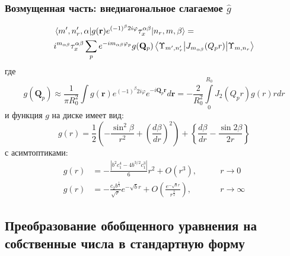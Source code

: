 \documentclass[a4paper,article,14pt]{extarticle}
\begin{document}
\subsubsection{Возмущенная часть: внедиагональное слагаемое $\hat g$}

\begin{equation}
\label{eq:final_g}
\begin{aligned}
&\mel{m', n'_r, \alpha} {g(\mathbf{r})   e^{ (-1)^{\beta} 2  i   \varphi} \tau^{\alpha \beta}_x} {n_r,m,\beta} = \\ 
&i^{m_{\alpha \beta}} \tau^{\alpha \beta}_x \sum\limits_{p}      e^{-i m_{\alpha \beta} \varphi_p}  g(\mathbf{Q}_p)\mel{\Upsilon_{m', n'_r}} {J_{m_{\alpha \beta}} ( Q_p r) }{\Upsilon_{m, n_r}}
\end{aligned}
\end{equation}
\noindent где 
\begin{equation}
\label{eq:fourier_g}
g (\mathbf{Q}_p) \approx \frac{1}{\pi R_0^2}  \int  g(\mathbf{r})   e^{ (-1)^{\beta} 2  i   \varphi} e^{-i \mathbf{Q}_p \mathbf{r}}  d\mathbf{r} = - \frac{2}{R_0^2}  \int\limits_{0}^{R_0}  J_2 (Q_p r ) g(r) r dr 
\end{equation} 
и функция $g$ на диске имеет вид:
\begin{equation}
g(r) = \frac{1}{2}\left(  - \frac{\sin ^2\beta }{r^2} + \left( \frac{d\beta }{dr} \right)^2 \right) 
+ \left\{ \frac{d\beta }{dr} - \frac{\sin 2\beta }{2r} \right\}
\end{equation}
с асимтоптиками:
\begin{equation}
\begin{aligned}
g(r) &= -\frac{\left|b^2 c_1^4-4 b^{3/2}
   c_1^3\right|}{6} r^2  +O\left(r^3\right), \qquad &r \rightarrow 0 \\
g(r) &= -\frac{c_2 b^\frac{1}{4}}{\sqrt{r}} e^{-\sqrt{b} r} + O\left(\frac{e^{-\sqrt{b} r}}{r^\frac{3}{2}}\right), \qquad &r \rightarrow \infty
\end{aligned}
\end{equation}



\subsection{ Преобразование обобщенного уравнения на собственные числа в стандартную форму  }
\end{document}
